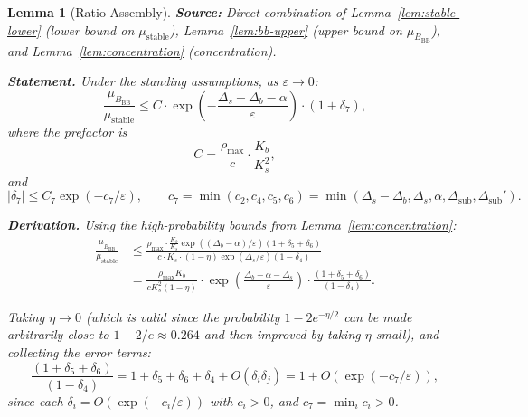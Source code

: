 \documentclass[11pt]{article}
\newtheorem{lemma}{Lemma}
\newcommand{\eps}{\varepsilon}
\newcommand{\Ds}{\Delta_s}
\newcommand{\Db}{\Delta_b}
\newcommand{\BBB}{B_{\mathrm{BB}}}
\begin{document}
\begin{lemma}[Ratio Assembly]\label{lem:ratio}
\textbf{Source:} Direct combination of
Lemma~\ref{lem:stable-lower} (lower bound on $\mu_{\mathrm{stable}}$),
Lemma~\ref{lem:bb-upper} (upper bound on $\mu_{\BBB}$),
and Lemma~\ref{lem:concentration} (concentration).

\medskip
\textbf{Statement.}
Under the standing assumptions, as $\eps \to 0$:
\begin{equation}\label{eq:ratio}
  \frac{\mu_{\BBB}}{\mu_{\mathrm{stable}}}
  \leq C \cdot \exp\!\left(
    -\frac{\Ds - \Db - \alpha}{\eps}
  \right)
  \cdot (1 + \delta_7),
\end{equation}
where the prefactor is
\begin{equation}\label{eq:C-prefactor}
  C = \frac{\rho_{\max}}{c} \cdot \frac{K_b}{K_s^2},
\end{equation}
and
\begin{equation}\label{eq:delta7}
  |\delta_7| \leq C_7 \exp(-c_7/\eps),
  \qquad
  c_7 = \min(c_2, c_4, c_5, c_6)
  = \min(\Ds - \Db, \Ds, \alpha, \Delta_{\mathrm{sub}}, \Delta_{\mathrm{sub}}').
\end{equation}

\medskip
\textbf{Derivation.}
Using the high-probability bounds from Lemma~\ref{lem:concentration}:
\begin{align*}
  \frac{\mu_{\BBB}}{\mu_{\mathrm{stable}}}
  &\leq \frac{\rho_{\max} \cdot \frac{K_b}{K_s}
    \exp((\Db - \alpha)/\eps)(1 + \delta_5 + \delta_6)}
  {c \cdot K_s \cdot (1 - \eta) \exp(\Ds/\eps)(1 - \delta_4)} \\
  &= \frac{\rho_{\max} K_b}{c K_s^2 (1-\eta)}
  \cdot \exp\!\left(\frac{\Db - \alpha - \Ds}{\eps}\right)
  \cdot \frac{(1 + \delta_5 + \delta_6)}{(1 - \delta_4)}.
\end{align*}

Taking $\eta \to 0$ (which is valid since the probability
$1 - 2e^{-\eta/2}$ can be made arbitrarily close to $1 - 2/e
\approx 0.264$ and then improved by taking $\eta$ small),
and collecting the error terms:
\[
  \frac{(1 + \delta_5 + \delta_6)}{(1 - \delta_4)}
  = 1 + \delta_5 + \delta_6 + \delta_4 + O(\delta_i \delta_j)
  = 1 + O(\exp(-c_7/\eps)),
\]
since each $\delta_i = O(\exp(-c_i/\eps))$ with $c_i > 0$, and
$c_7 = \min_i c_i > 0$.


\end{lemma}
\end{document}
